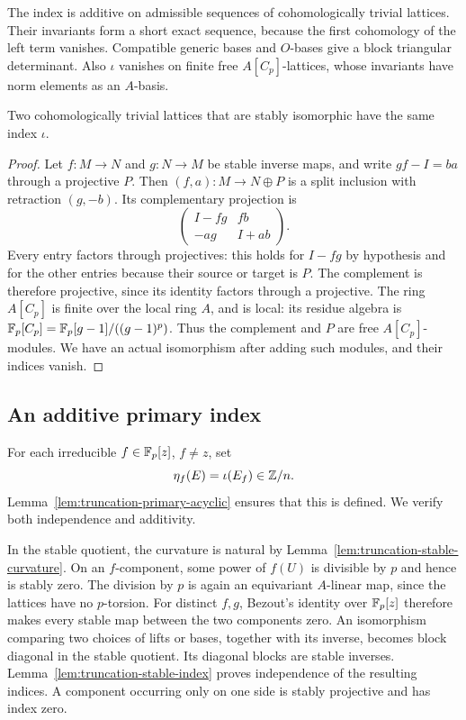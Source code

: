 The index is additive on admissible sequences of cohomologically
trivial lattices.  Their invariants form a short exact sequence,
because the first cohomology of the left term vanishes.  Compatible
generic bases and $O$-bases give a block triangular determinant.
Also $\iota$ vanishes on finite free $A[C_p]$-lattices, whose
invariants have norm elements as an $A$-basis.

\begin{lemma}\label{lem:truncation-stable-index}
Two cohomologically trivial lattices that are stably isomorphic
have the same index $\iota$.
\end{lemma}

\begin{proof}
Let $f:M\to N$ and $g:N\to M$ be stable inverse maps, and write
$gf-I=ba$ through a projective $P$.
Then $(f,a):M\to N\oplus P$ is a split inclusion with retraction
$(g,-b)$.  Its complementary projection is
\[
 \begin{pmatrix}I-fg&fb\\-ag&I+ab\end{pmatrix}.
\]
Every entry factors through projectives: this holds for $I-fg$
by hypothesis and for the other entries because their source or
target is $P$.  The complement is therefore projective, since its
identity factors through a projective.
The ring $A[C_p]$ is finite over the local ring $A$, and is local:
its residue algebra is
$\mathbb F_p[C_p]=\mathbb F_p[g-1]/((g-1)^p)$.
Thus the complement and $P$ are free $A[C_p]$-modules.
We have an actual isomorphism after adding such modules, and their
indices vanish.
\end{proof}

\subsection{An additive primary index}

For each irreducible $f\in\mathbb F_p[z]$, $f\ne z$, set
\[
 \eta_f(E)=\iota(E_f)\in\mathbb Z/n.
\]
Lemma~\ref{lem:truncation-primary-acyclic} ensures that this is
defined.  We verify both independence and additivity.

In the stable quotient, the curvature is natural by
Lemma~\ref{lem:truncation-stable-curvature}.  On an $f$-component,
some power of $f(U)$ is divisible by $p$ and hence is stably zero.
The division by $p$ is again an equivariant $A$-linear map, since
the lattices have no $p$-torsion.  For distinct $f,g$, Bezout's
identity over $\mathbb F_p[z]$ therefore makes every stable map between
the two components zero.  An isomorphism comparing two choices of
lifts or bases, together with its inverse, becomes block diagonal
in the stable quotient.  Its diagonal blocks are stable inverses.
Lemma~\ref{lem:truncation-stable-index} proves independence of the
resulting indices.  A component occurring only on one side is
stably projective and has index zero.

